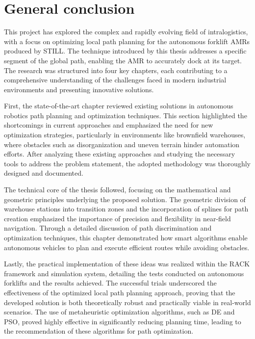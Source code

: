 \chapter*{General conclusion}

This project has explored the complex and rapidly evolving field of intralogistics, with a focus on optimizing 
local path planning for the autonomous forklift AMRs produced by STILL. The technique introduced by this 
thesis addresses a specific segment of the global path, enabling the AMR to accurately dock at its target. 
The research was structured into four key chapters, each contributing to a comprehensive understanding of the 
challenges faced in modern industrial environments and presenting innovative solutions.

First, the state-of-the-art chapter reviewed existing solutions in autonomous robotics path planning and 
optimization techniques. This section highlighted the shortcomings in current approaches and emphasized 
the need for new optimization strategies, particularly in environments like brownfield warehouses, where 
obstacles such as disorganization and uneven terrain hinder automation efforts. After analyzing these 
existing approaches and studying the necessary tools to address the problem statement, the adopted methodology 
was thoroughly designed and documented.

The technical core of the thesis followed, focusing on the mathematical and geometric principles underlying 
the proposed solution. The geometric division of warehouse stations into transition zones and the incorporation 
of splines for path creation emphasized the importance of precision and flexibility in near-field navigation. 
Through a detailed discussion of path discrimination and optimization techniques, this chapter demonstrated 
how smart algorithms enable autonomous vehicles to plan and execute efficient routes while avoiding obstacles.

Lastly, the practical implementation of these ideas was realized within the RACK framework and simulation 
system, detailing the tests conducted on autonomous forklifts and the results achieved. The successful 
trials underscored the effectiveness of the optimized local path planning approach, proving that the 
developed solution is both theoretically robust and practically viable in real-world scenarios. The use 
of metaheuristic optimization algorithms, such as DE and PSO, proved highly effective in significantly 
reducing planning time, leading to the recommendation of these algorithms for path optimization.

